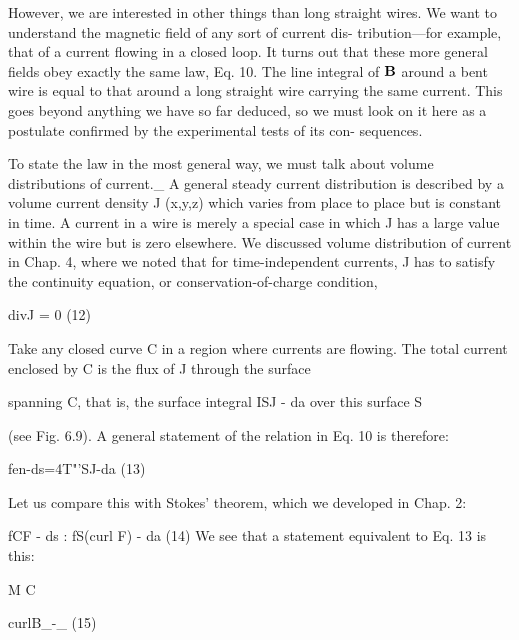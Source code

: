 However, we are interested in other things than long straight wires.
We want to understand the magnetic field of any sort of current dis-
tribution---for example, that of a current flowing in a closed loop. It
turns out that these more general fields obey exactly the same law,
Eq. 10. The line integral of $\mathbf{B}$ around a bent wire is equal to that
around a long straight wire carrying the same current. This goes
beyond anything we have so far deduced, so we must look on it here
as a postulate confirmed by the experimental tests of its con-
sequences.

To state the law in the most general way, we must talk about volume
distributions of current._ A general steady current distribution
is described by a volume current density J (x,y,z) which varies from
place to place but is constant in time. A current in a wire is merely
a special case in which J has a large value within the wire but is zero
elsewhere. We discussed volume distribution of current in Chap. 4,
where we noted that for time-independent currents, J has to satisfy
the continuity equation, or conservation-of-charge condition,

\begin{equation}
\end{equation}
divJ = 0 (12)

 

Take any closed curve C in a region where currents are flowing.
The total current enclosed by C is the flux of J through the surface

spanning C, that is, the surface integral ISJ - da over this surface S

(see Fig. 6.9). A general statement of the relation in Eq. 10 is
therefore:

\begin{equation}
\end{equation}
fen-ds=4T"'SJ-da (13)

Let us compare this with Stokes' theorem, which we developed in
Chap. 2:

\begin{equation}
\end{equation}
fCF - ds : fS(curl F) - da (14)
We see that a statement equivalent to Eq. 13 is this:

M
C

\begin{equation}
\end{equation}
curlB_-_ (15)

